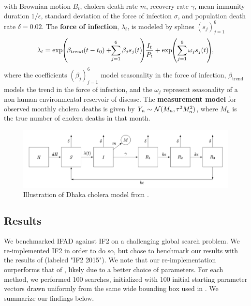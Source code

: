 \documentclass[9pt,twocolumn,twoside]{pnas-new}
\begin{document}
with Brownian motion $B_t$, cholera death rate $m$, recovery rate $\gamma$, mean immunity duration $1/\epsilon$, standard deviation of the force of infection $\sigma$, and population death rate $\delta=0.02$. The \textbf{force of infection}, $\lambda_t$, is modeled by splines $(s_j)_{j=1}^6$
\vspace*{-2mm}
\begin{equation*}
    \lambda_t=\exp\hspace{-1mm}\left(\hspace{-.5mm}\beta_{\text{trend}}(t-t_0)+\hspace{-1mm}\sum_{j=1}^{6} \beta_j s_j(t)\hspace{-1mm}\right)\hspace{-1mm}\frac{I_t}{P_t} + \exp\hspace{-1mm} \left(\sum_{j=1}^{6} \omega_j s_j(t)\hspace{-1mm}\right)\hspace{-1mm},
    \vspace*{-2mm}
\end{equation*}
where the coefficients $(\beta_j)_{j=1}^6$ model seasonality in the force of infection, $\beta_{\text{trend}}$ models the trend in the force of infection, and the $\omega_j$ represent seasonality of a non-human environmental reservoir of disease. The \textbf{measurement model} for observed monthly cholera deaths is given by 
    $Y_n \sim {\mathcal{N}}(M_n, \tau^2M_n^2)$,
where $M_n$ is the true number of cholera deaths in that month.

\begin{figure}
    \centering
    \includegraphics[width=\textwidth/2]{imgs/095/tikzcholera.png}
    \vspace*{-7mm}
    \caption{Illustration of Dhaka cholera model from \cite{king08}.}
    \label{fig:tikz-cholera}
\end{figure}

\subsection{Results}

We benchmarked IFAD against IF2 on a challenging global search problem. We re-implemented IF2 in order to do so, but chose to benchmark our results with the results of \cite{ionides15} (labeled "IF2 2015"). We note that our re-implementation ourperforms that of \cite{ionides15}, likely due to a better choice of parameters. For each method, we performed 100 searches, initialized with 100 initial starting parameter vectors drawn uniformly from the same wide bounding box used in \cite{ionides15}. We summarize our findings below. 
\end{document}
